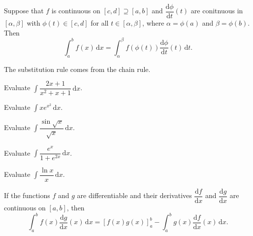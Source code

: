 \documentclass[11pt]{article}
\theoremstyle{break}
\theoremstyle{no_label}
\newcommand{\derivative}[2]{\dfrac{\dd{#1}}{\dd{#2}}}
\newcommand{\dd}{\text{d}}
\newcommand{\ddi}{\text{$\,$d}}
\numberwithin{equation}{theorem}
\begin{document}
\begin{theorem}
    Suppose that $f$ is continuous on $[c, d]\supseteq[a, b]$ and $\derivative{\phi}{t}(t)$ are conitnuous in $[\alpha, \beta]$ with $\phi(t)\in[c, d]$ for all $t\in[\alpha, \beta]$, where $\alpha=\phi(a)$ and $\beta=\phi(b)$. Then $$\int_a^b f(x)\ddi x=\int_{\alpha}^{\beta}f(\phi(t))\derivative{\phi}{t}(t)\ddi t.$$
\end{theorem}

\begin{remark}
    The substitution rule comes from the chain rule.
\end{remark}

\begin{example}
    Evaluate $\displaystyle\int\dfrac{2x+1}{x^2+x+1}\ddi x$.
\end{example}
\newpage

\begin{example}
    Evaluate $\displaystyle\int x e^{x^2}\ddi x$.
\end{example}
\vspace{8em}

\begin{example}
    Evaluate $\displaystyle\int\dfrac{\sin\sqrt{x}}{\sqrt{x}}\ddi x$.
\end{example}
\vspace{8em}

\begin{example}
    Evaluate $\displaystyle\int\dfrac{e^x}{1+e^{2x}}\ddi x$.
\end{example}
\vspace{8em}

\begin{example}
    Evaluate $\displaystyle\int\dfrac{\ln x}{x}\ddi x$.
\end{example}
\vspace{8em}

\begin{theorem}
    If the functions $f$ and $g$ are differentiable and their derivatives $\derivative{f}{x}$ and $\derivative{g}{x}$ are continuous on $[a, b]$, then $$\int_a^b f(x)\derivative{g}{x}(x)\ddi x=\left[f(x)g(x)\right]_a^b-\int_a^b g(x)\derivative{f}{x}(x)\ddi x.$$
\end{theorem}
\end{document}
